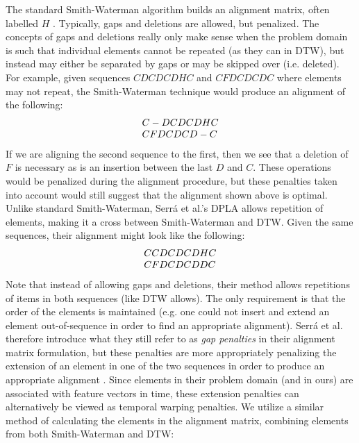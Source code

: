 \documentclass[a4paper,12pt]{report} 	%
\numberwithin{figure}{chapter}
\numberwithin{table}{chapter}
\numberwithin{equation}{chapter}
\begin{document}
\begin{flushleft}
The standard Smith-Waterman algorithm builds an alignment matrix, often labelled $H$ \cite{smith1981textordfeminineidentification}. Typically, gaps and deletions are allowed, but penalized. The concepts of gaps and deletions really only make sense when the problem domain is such that individual elements cannot be repeated (as they can in DTW), but instead may either be separated by gaps or may be skipped over (i.e. deleted). For example, given sequences $CDCDCDHC$ and $CFDCDCDC$ where elements may not repeat, the Smith-Waterman technique would produce an alignment of the following:
\begin{equation}
\begin{array}{l l}
C-DCDCDHC\\
CFDCDCD-C
\end{array}
\end{equation}
If we are aligning the second sequence to the first, then we see that a deletion of $F$ is necessary as is an insertion between the last $D$ and $C$. These operations would be penalized during the alignment procedure, but these penalties taken into account would still suggest that the alignment shown above is optimal. Unlike standard Smith-Waterman, Serr\'a et al.'s DPLA allows repetition of elements, making it a cross between Smith-Waterman and DTW. Given the same sequences, their alignment might look like the following:
\begin{equation}
\begin{array}{l l}
CCDCDCDHC\\
CFDCDCDDC
\end{array}
\end{equation}
Note that instead of allowing gaps and deletions, their method allows repetitions of items in both sequences (like DTW allows). The only requirement is that the order of the elements is maintained (e.g. one could not insert and extend an element out-of-sequence in order to find an appropriate alignment). Serr\'a et al. therefore introduce what they still refer to as \emph{gap penalties} in their alignment matrix formulation, but these penalties are more appropriately penalizing the extension of an element in one of the two sequences in order to produce an appropriate alignment \cite{serra2008chroma}. Since elements in their problem domain (and in ours) are associated with feature vectors in time, these extension penalties can alternatively be viewed as temporal warping penalties. We utilize a similar method of calculating the elements in the alignment matrix, combining elements from both Smith-Waterman and DTW:

\end{flushleft}
\end{document}
